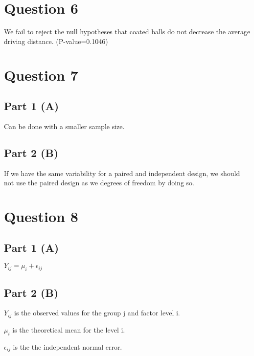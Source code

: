 \documentclass[]{article}
\begin{document}
\hypertarget{question-6}{%
\section{Question 6}\label{question-6}}

We fail to reject the null hypotheses that coated balls do not decrease
the average driving distance. (P-value=0.1046)

\hypertarget{question-7}{%
\section{Question 7}\label{question-7}}

\hypertarget{part-1-a}{%
\subsection{Part 1 (A)}\label{part-1-a}}

Can be done with a smaller sample size.

\hypertarget{part-2-b}{%
\subsection{Part 2 (B)}\label{part-2-b}}

If we have the same variability for a paired and independent design, we
should not use the paired design as we degrees of freedom by doing so.

\hypertarget{question-8}{%
\section{Question 8}\label{question-8}}

\hypertarget{part-1-a-1}{%
\subsection{Part 1 (A)}\label{part-1-a-1}}

\(Y_{ij}=\mu_i+\epsilon_{ij}\)

\hypertarget{part-2-b-1}{%
\subsection{Part 2 (B)}\label{part-2-b-1}}

\(Y_{ij}\) is the observed values for the group j and factor level i.

\(\mu_i\) is the theoretical mean for the level i.

\(\epsilon_{ij}\) is the the independent normal error.
\end{document}
